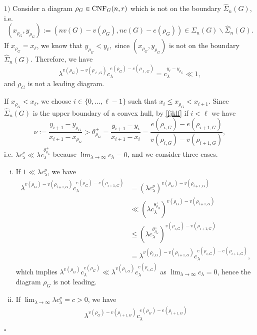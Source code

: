 \documentclass[12pt]{article}
\newenvironment{Proof}{\removelastskip\par\medskip
\noindent{\em Proof.} \rm}{\penalty-20\null\hfill$\square$\par\medbreak}
\numberwithin{equation}{section}
\begin{document}
\begin{Proof}
\noindent
$1)$ Consider a diagram
$\rho_G\in {\rm CNF}_G(n,r)$ which is not on the boundary
$\widehat{\Sigma}_n(G)$, i.e. 
$$
( x_{\rho_G} , y_{\rho_G} ) :=
( nv(G)-v(\rho_G) , ne(G)-e(\rho_G) )
\in\Sigma_n(G)\backslash \widehat{\Sigma}_n(G).
$$ 
 If $x_{\rho_G}=x_\ell$, we know that $y_{\rho_G}<y_\ell,$ since $(x_{\rho_G},y_{\rho_G})$ is not on the boundary $\widehat{\Sigma}_n(G)$. Therefore, we have 
 $$\lambda^{v(\rho_G)-v(\rho_{\ell,G})}c_\lambda^{e(\rho_G)-e (\rho_{\ell,G})}=c_\lambda^{y_{\ell}-y_{\rho_G}}\ll1,
 $$
 and $\rho_G$ is not a leading diagram.

 \medskip

 If $x_{\rho_G}<x_\ell$, we choose $i\in \{0,\ldots , \ell-1 \}$
such that
 $x_i\le x_{\rho_G} <x_{i+1}$. 
Since $\widehat{\Sigma}_n(G)$ is the upper boundary of a
convex hull, by \eqref{fjklf} 
 if $i<\ell $ we have 
 $$\nu:=\frac{y_{i+1}-y_{\rho_G}}{x_{i+1}-x_{\rho_G}}
 > \theta^+_{\rho_G} = \frac{y_{i+1}-y_i}{x_{i+1}-x_i}
 = \frac{e(\rho_{i,G})-e(\rho_{i+1,G})}{v(\rho_{i,G})-v(\rho_{i+1,G})},
 $$
 i.e. $\lambda c_\lambda^\nu
 \ll\lambda c_\lambda^{\theta^+_{\rho_G}}$
 because $\lim_{\lambda \to \infty} c_\lambda =0$, and 
 we consider three cases.
 \begin{enumerate}[i)]
   \item If
 $
1\ll\lambda c_\lambda^\nu
$, we have 
\begin{align*}
  \lambda^{v({\rho_G})-v(\rho_{i+1,G})}c_\lambda^{e({\rho_G})-e(\rho_{i+1,G})}
  & =  \left(\lambda c_\lambda^\nu\right)^{v({\rho_G})-v(\rho_{i+1,G})}
  \\
  & \ll \left(\lambda c_\lambda^{\theta^+_{\rho_G}} \right)^{v({\rho_G})-v(\rho_{i+1,G})}
  \\
   &   \leq \left(\lambda c_\lambda^{\theta^+_{\rho_G}}\right)^{v(\rho_{i,G})-v(\rho_{i+1,G})}
  \\
   & =  \lambda^{v(\rho_{i,G})-v(\rho_{i+1,G})}c_\lambda^{e(\rho_{i,G})-e(\rho_{i+1,G})}, 
\end{align*}
which implies $\lambda^{v({\rho_G})}c_\lambda^{e({\rho_G})}\ll \lambda^{v(\rho_{i,G})}c_\lambda^{e(\rho_{i,G})}$
 as $\lim_{\lambda \to \infty} c_\lambda =0$, hence
 the diagram $\rho_G$ is not leading. 
\item  If
 $\lim_{\lambda \to \infty} \lambda c_\lambda^\nu = c>0$, we have 
\begin{align*}
  \lambda^{v({\rho_G})-v(\rho_{i+1,G})}c_\lambda^{e({\rho_G})-e(\rho_{i+1,G})}

\end{align*}
\end{enumerate}
\end{Proof}
\end{document}
